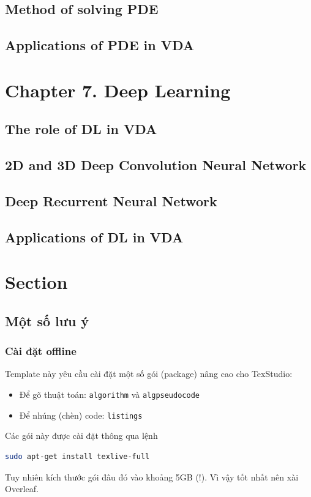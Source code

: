 \subsection{Method of solving PDE}
\subsection{Applications of PDE in VDA}

\section{Chapter 7. Deep Learning}
\subsection{The role of DL in VDA}
\subsection{2D and 3D Deep Convolution Neural Network}
\subsection{Deep Recurrent Neural Network}
\subsection{Applications of DL in VDA}

% 











\section{Section}

\subsection{Một số lưu ý}

\subsubsection{Cài đặt offline}
Template này yêu cầu cài đặt một số gói (package) nâng cao cho TexStudio:
\begin{itemize}
\item Để gõ thuật toán: \texttt{algorithm} và \texttt{algpseudocode}
\item Để nhúng (chèn) code: \texttt{listings}
\end{itemize}
Các gói này được cài đặt thông qua lệnh
\begin{lstlisting}[language=sh]
sudo apt-get install texlive-full
\end{lstlisting}
Tuy nhiên kích thước gói đâu đó vào khoảng 5GB (!). Vì vậy tốt nhất nên xài Overleaf.

